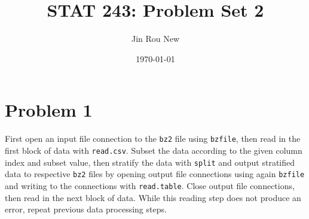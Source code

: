 \documentclass{article}\usepackage[]{graphicx}\usepackage[]{color}
\title{STAT 243: Problem Set 2}
\author{Jin Rou New}
\date{\today}
\begin{document}
\maketitle

\section{Problem 1}
First open an input file connection to the \texttt{bz2} file using \texttt{bzfile}, then read in the first block of data with \texttt{read.csv}. Subset the data according to the given column index and subset value, then stratify the data with \texttt{split} and output stratified data to respective \texttt{bz2} files by opening output file connections using again \texttt{bzfile} and writing to the connections with \texttt{read.table}. Close output file connections, then read in the next block of data. While this reading step does not produce an error, repeat previous data processing steps.
\end{document}
